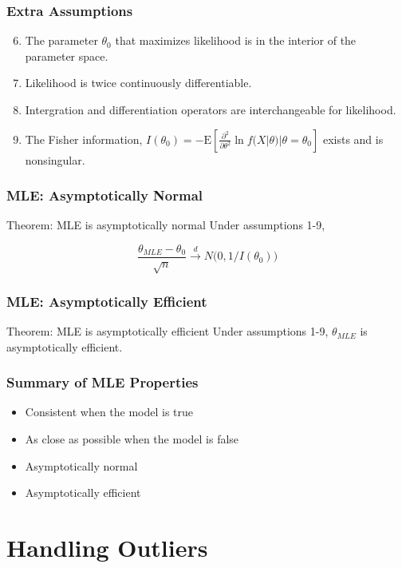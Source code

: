 \documentclass[12pt, block=fill]{beamer}
\newcommand{\E}{\text{E}}
\begin{document}
\begin{frame}
  \frametitle{Extra Assumptions}

  \begin{enumerate}
   \setcounter{enumi}{5}
\item  The parameter $\theta_0$ that maximizes likelihood is in the interior of the parameter space.
\item  Likelihood is twice continuously differentiable.
\item  Intergration and differentiation operators are interchangeable for likelihood.
\item The Fisher information, $I(\theta_0) = - \E[ \frac{\partial^2 }{\partial \theta^2} \ln f(X|\theta) | \theta=\theta_0]  $ exists and is nonsingular.
\end{enumerate}
\end{frame}


\begin{frame}
  \frametitle{MLE: Asymptotically Normal}
  \begin{block}{Theorem: MLE is asymptotically normal}
  Under assumptions 1-9,

  $$\frac{\theta_{MLE} - \theta_0 }{\sqrt{n}} \overset{d}{\rightarrow} N\big(0,1/I(\theta_0)\big)$$


  \end{block}
\end{frame}

\begin{frame}
  \frametitle{MLE: Asymptotically Efficient}
    \begin{block}{Theorem: MLE is asymptotically efficient}
      Under assumptions 1-9, $\theta_{MLE}$ is asymptotically efficient.
  \end{block}
\end{frame}

\begin{frame}
  \frametitle{Summary of MLE Properties}
  \begin{itemize}
\item Consistent when the model is true
\item As close as possible when the model is false
\item Asymptotically normal
\item Asymptotically efficient
\end{itemize}

\end{frame}


\section{Handling Outliers}
\end{document}
